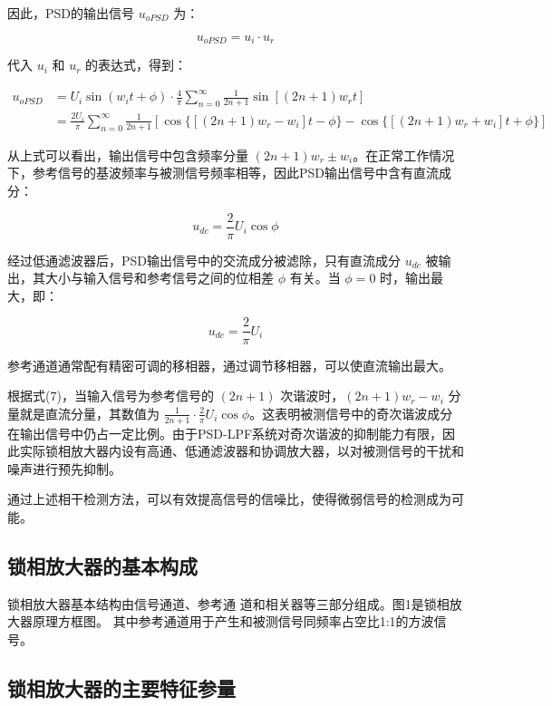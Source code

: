 \documentclass[12pt,a4paper]{article}
\begin{document}
因此，PSD的输出信号 $u_{oPSD}$ 为：

\begin{equation}
u_{oPSD} = u_i \cdot u_r
\end{equation}

代入 $u_i$ 和 $u_r$ 的表达式，得到：

\begin{align}
u_{oPSD} &= U_i \sin(w_i t + \phi) \cdot \frac{4}{\pi} \sum_{n=0}^{\infty} \frac{1}{2n+1} \sin[(2n+1) w_r t] \\
&= \frac{2U_i}{\pi} \sum_{n=0}^{\infty} \frac{1}{2n+1} \left[\cos\{[(2n+1) w_r - w_i]t - \phi\} - \cos\{[(2n+1) w_r + w_i]t + \phi\}\right]
\end{align}

从上式可以看出，输出信号中包含频率分量 $(2n+1) w_r \pm w_i$。在正常工作情况下，参考信号的基波频率与被测信号频率相等，因此PSD输出信号中含有直流成分：

\begin{equation}
u_{dc} = \frac{2}{\pi} U_i \cos \phi
\end{equation}

经过低通滤波器后，PSD输出信号中的交流成分被滤除，只有直流成分 $u_{dc}$ 被输出，其大小与输入信号和参考信号之间的位相差 $\phi$ 有关。当 $\phi = 0$ 时，输出最大，即：

\begin{equation}
u_{dc} = \frac{2}{\pi} U_i
\end{equation}

参考通道通常配有精密可调的移相器，通过调节移相器，可以使直流输出最大。

根据式(7)，当输入信号为参考信号的 $(2n+1)$ 次谐波时，$(2n+1) w_r - w_i$ 分量就是直流分量，其数值为 $\frac{1}{2n+1} \cdot \frac{2}{\pi} U_i \cos \phi$。这表明被测信号中的奇次谐波成分在输出信号中仍占一定比例。由于PSD-LPF系统对奇次谐波的抑制能力有限，因此实际锁相放大器内设有高通、低通滤波器和协调放大器，以对被测信号的干扰和噪声进行预先抑制。

通过上述相干检测方法，可以有效提高信号的信噪比，使得微弱信号的检测成为可能。
\subsection{锁相放大器的基本构成}
锁相放大器基本结构由信号通道、参考通 道和相关器等三部分组成。图1是锁相放大器原理方框图。
其中参考通道用于产生和被测信号同频率占空比1:1的方波信号。   
\subsection{锁相放大器的主要特征参量}
\end{document}
